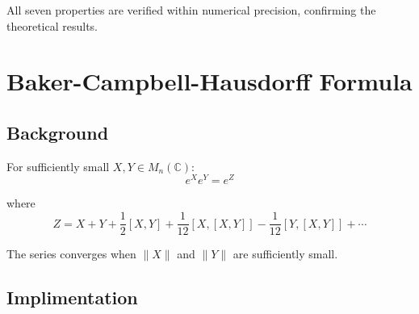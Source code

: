 \documentclass[
]{book}
\theoremstyle{definition}
\theoremstyle{definition}
\theoremstyle{definition}
\theoremstyle{definition}
\theoremstyle{remark}
\begin{document}
All seven properties are verified within numerical precision, confirming the theoretical results.

\section{Baker-Campbell-Hausdorff Formula}\label{baker-campbell-hausdorff-formula}

\subsection{Background}\label{background}

For sufficiently small \(X, Y \in M_n(\mathbb{C})\):\[e^X e^Y = e^{Z}\]

where \[Z = X + Y + \frac{1}{2}[X,Y] + \frac{1}{12}[X,[X,Y]] - \frac{1}{12}[Y,[X,Y]] + \cdots\]

The series converges when \(\|X\|\) and \(\|Y\|\) are sufficiently small.

\subsection{Implimentation}\label{implimentation}
\end{document}
